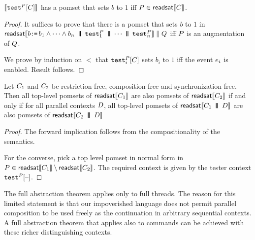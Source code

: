 \begin{lemma}\label{tester}
$\sem{\testP{\aPS}{}\hole{\aCmd}}$  has a pomset that sets $b$ to $1$ iff $P \in \mathsf{readsat}\llbracket C\rrbracket$.
\begin{proof}
It suffices to prove that there is a pomset that sets $b$ to $1$ in
 $\mathsf{readsat}\llbracket b \texttt{:}\mkern-1mu\texttt{=}\, b_{1} \land  \cdots \land b_{n}
\,\mathbin{\texttt{\textbf{|}}\mkern-6mu\texttt{\textbf{|}}}\,  {\tt test}^{P}_{1} 
\,\mathbin{\texttt{\textbf{|}}\mkern-6mu\texttt{\textbf{|}}}\,   \cdots 
\,\mathbin{\texttt{\textbf{|}}\mkern-6mu\texttt{\textbf{|}}}\,  {\tt test}^{P}_{n}\rrbracket \parallel Q$ iff $P$ is an augmentation of $Q$. 

We prove by induction on $\lt$ that $\testP{\aPS}{i}\hole{\aCmd}$  sets $b_i$ to $1$ iff the event $e_i$ is enabled. Result follows.
\end{proof}
\end{lemma}

\begin{theorem}
  Let $C_1$ and $C_2$ be restriction-free, composition-free and
  synchronization free.  Then all top-level pomsets of
  $\mathsf{readsat}\llbracket C_1\rrbracket$ are also pomsets of $\mathsf{readsat}\llbracket C_2\rrbracket$ if
  and only if for all parallel contexts $D$, all top-level pomsets of
  $\mathsf{readsat}\llbracket C_1 \,\mathbin{\texttt{\textbf{|}}\mkern-6mu\texttt{\textbf{|}}}\, D\rrbracket$ are also pomsets of
  $\mathsf{readsat}\llbracket C_2 \,\mathbin{\texttt{\textbf{|}}\mkern-6mu\texttt{\textbf{|}}}\, D\rrbracket$
\begin{proof}
  The forward implication follows from the compositionality of the semantics.

  For the converse, pick a top level pomset in normal form in
  $P \in \mathsf{readsat}\llbracket C_1\rrbracket \setminus \mathsf{readsat}\llbracket C_2\rrbracket $.  The
  required context is given by the tester context $\testP{\aPS}{}\hole{}$.
 \end{proof}
\end{theorem}

The full abstraction theorem applies only to full threads.  The reason for this limited statement is that our impoverished language does not permit  parallel composition to be used freely as the continuation in arbitrary sequential contexts.  A full abstraction theorem that applies also to commands can be achieved with these richer distinguishing contexts.  
